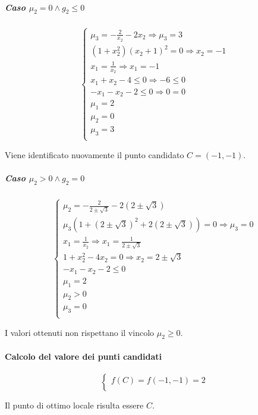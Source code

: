 \documentclass[\main/main.tex]{subfiles}
\begin{document}
\subparagraph*{Caso $\mu_2 = 0 \land g_2 \leq 0$}
\[
  \begin{cases}
    \mu_3 = -\frac{2}{x_2} - 2x_2  \Rightarrow \mu_3 = 3 \\
    (1 + x^2_2) (x_2+1)^2 = 0  \Rightarrow x_2 = -1      \\
    x_1 = \frac{1}{x_2}   \Rightarrow x_1 = -1           \\
    x_1 + x_2 -4 \leq 0       \Rightarrow -6 \leq 0      \\
    -x_1 - x_2 - 2 \leq 0 \Rightarrow  0 = 0             \\
    \mu_1 = 2                                            \\
    \mu_2 = 0                                            \\
    \mu_3 = 3                                            \\
  \end{cases}
\]

Viene identificato nuovamente il punto candidato $C = (-1, -1)$.

\subparagraph*{Caso $\mu_2 > 0 \land g_2 = 0$}

\[
  \begin{cases}
    \mu_2 = -\frac{2}{2 \pm \sqrt{3}} - 2(2 \pm \sqrt{3})                        \\
    \mu_3 (1 + (2 \pm \sqrt{3})^2 + 2(2 \pm \sqrt{3})) = 0 \Rightarrow \mu_3 = 0 \\
    x_1 = \frac{1}{x_2}  \Rightarrow x_1 = \frac{1}{2 \pm \sqrt{3}}              \\
    1 + x^2_2 -4x_2 = 0  \Rightarrow x_2 = 2 \pm \sqrt{3}                        \\
    -x_1 - x_2 - 2 \leq 0                                                        \\
    \mu_1 = 2                                                                    \\
    \mu_2 > 0                                                                    \\
    \mu_3 = 0                                                                    \\
  \end{cases}
\]

I valori ottenuti non rispettano il vincolo $\mu_2 \geq 0$.

\paragraph*{Calcolo del valore dei punti candidati}

\[
  \begin{cases}
    f(C) = f(-1, -1) = 2 \\
  \end{cases}
\]

Il punto di ottimo locale risulta essere $C$.
\end{document}
